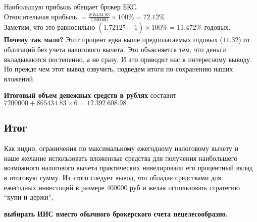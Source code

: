 Наибольшую прибыль обещает брокер БКС.\\
Относительная прибыль $= \displaystyle{\frac{865434.83}{1200000}} \times 100 \%  = 72.12 \%$\\
Заметим, что это равносильно $(1.7212^\frac{1}{5} - 1) \times 100\% = 11.472\%$ годовых. \\

\textbf{Почему так мало?} Этот процент едва выше предполагаемых годовых ($11.32$) от облигаций без учета налогового вычета. Это объясняется тем, что деньги вкладываются постепенно, а не сразу. И это приводит нас к интересному выводу. Но прежде чем этот вывод озвучить, подведем итоги по сохранению наших вложений.

\textbf{Итоговый объем денежных средств в рублях } составит $7 200 000  + 865434.83 \times 6 = 12\ 392\ 608.98$

\subsection{Итог}
Как видно, ограничения по максимальному ежегодному налоговому вычету и наше желание использовать вложенные средства для получения наибольшего возможного налогового вычета практических нивелировали его процентный вклад в итоговую сумму. Из этого следует вывод, что обладая средствами для ежегодных инвестиций в размере 400000 руб и желая использовать стратегию ``купи и держи'',
\begin{center}
\textbf{выбирать ИИС вместо обычного  брокерского счета нецелесообразно.}
\end{center}